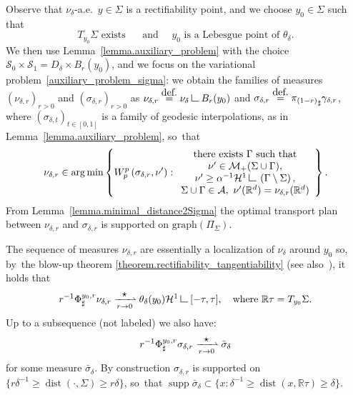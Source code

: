 \documentclass[11pt]{article}
\numberwithin{equation}{section}
\let\ts\textstyle
\theoremstyle{definition}
\newcommand{\eqdef}{\ensuremath{\stackrel{\mbox{\upshape\tiny def.}}{=}}}
\newcommand\LM[1]{\hbox{\vrule width.5pt \vbox to#1pt{\vfill \hrule width#1pt height.5pt}}}
\newcommand\LL{{\mathchoice {\>\LM7\>}{\>\LM7\>}{\,\LM5\,}{\,\LM{3.35}\,}}}
\newcommand{\mres}{\LL}
\newcommand{\RR}{\mathbb{R}}
\DeclareMathOperator*{\argmin}{arg\,min}
\DeclareMathOperator{\dist}{dist}
\DeclareMathOperator{\supp}{supp}
\begin{document}
Observe that $\nu_\delta$-a.e.~$y \in \Sigma$ is a rectifiability point, and we choose $y_0 \in \Sigma$ such that
\begin{equation}\label{y0fixed_for_blowup}
T_{y_0}\Sigma \text{ exists }
\quad\text{ and } \quad
y_0 \text{ is a Lebesgue point of }
\theta_\delta.
\end{equation}
We then use Lemma~\ref{lemma.auxiliary_problem} with the choice $\mathcal{S}_0\times \mathcal{S}_1 = D_{\delta}\times B_r(y_0)$, and we focus on the variational problem~\eqref{auxiliary_problem_sigma}: we obtain the families of measures $\left(\nu_{\delta ,r}\right)_{r > 0}$ and $\left(\sigma_{\delta ,r}\right)_{r > 0}$ as $\nu_{\delta ,r} \eqdef \nu_\delta \mres B_r(y_0)$ and $\sigma_{\delta ,r} \eqdef {\pi_{(1-r)}}_\sharp\gamma_{\delta,r}$, where $\left(\sigma_{\delta,t}\right)_{t \in [0,1]}$ is a family of geodesic interpolations, as in Lemma~\ref{lemma.auxiliary_problem}, so~that
\begin{equation}\label{auxiliary_problem_geodesic}
\nu_{\delta ,r}
\in
\argmin
\left\{
W_p^p\left(
\sigma_{\delta ,r}, \nu'
\right) :
\begin{array}{c}
\text{there exists $\Gamma$ such that}\\
\nu' \in \mathcal{M}_+(\Sigma \cup \Gamma),\\
\nu' \ge \alpha^{-1}\mathcal{H}^1\mres \left(\Gamma\setminus \Sigma\right), \\
\Sigma \cup \Gamma \in \mathcal{A}, \
\nu'(\RR^d) = \nu_{\delta ,r}(\RR^d)
\end{array}
\right\}.
\end{equation}
From Lemma~\ref{lemma.minimal_distance2Sigma} the optimal transport plan between $\nu_{\delta ,r}$ and $\sigma_{\delta ,r}$ is supported on $\text{graph}(\Pi_\Sigma)$.

The sequence of measures $\nu_{\delta ,r}$ are essentially a localization of $\nu_\delta$ around $y_0$ so, by~the blow-up theorem \ref{theorem.rectifiability_tangentiability} (see also~\cite[Th.\,2.83]{ambrosio2000functions}), it holds that
\begin{equation}\label{blowup_measures_nu}
r^{-1}\Phi^{y_0,r}_{\sharp}\nu_{\delta ,r} \xrightharpoonup[r \to 0]{\ts\star}
\theta_\delta(y_0)\mathcal{H}^1\mres [-\tau, \tau],
\quad\text{where $\RR\tau = T_{y_0}\Sigma$.}
\end{equation}
Up to a subsequence (not labeled) we also have:
\begin{equation}\label{blowup_measures_sigma}
r^{-1}\Phi^{y_0,r}_{\sharp}\sigma_{\delta ,r} \xrightharpoonup[r \to 0]{\ts\star}
\bar \sigma_{\delta}
\end{equation}
for some measure $\bar \sigma_{\delta}$.
By construction $\sigma_{\delta ,r}$ is supported on $\{r\delta^{-1}\ge\dist(\cdot,\Sigma)\ge r\delta\}$, so~that $\supp \bar \sigma_{\delta} \subset \{x : \delta^{-1} \ge \dist(x,\RR\tau) \ge \delta \}$.
\end{document}
